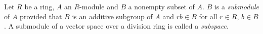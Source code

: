 Let $R$ be a ring, $A$ an $R$-module and $B$ a nonempty subset of $A$. $B$ is a \emph{submodule} of $A$ provided that $B$ is an additive subgroup of $A$ and $rb \in B$ for all $r \in R$, $b \in B$. A submodule of a vector space over a division ring is called a \emph{subspace}.
